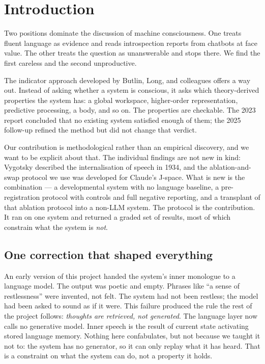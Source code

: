 \documentclass[11pt]{article}
\begin{document}
\section{Introduction}

Two positions dominate the discussion of machine consciousness. One treats fluent language as evidence and reads introspection reports from chatbots at face value. The other treats the question as unanswerable and stops there. We find the first careless and the second unproductive.

The indicator approach developed by Butlin, Long, and colleagues offers a way out. Instead of asking whether a system is conscious, it asks which theory-derived properties the system has: a global workspace, higher-order representation, predictive processing, a body, and so on. The properties are checkable. The 2023 report concluded that no existing system satisfied enough of them; the 2025 follow-up refined the method but did not change that verdict.

Our contribution is methodological rather than an empirical discovery, and we want to be explicit about that. The individual findings are not new in kind: Vygotsky described the internalisation of speech in 1934, and the ablation-and-swap protocol we use was developed for Claude's J-space. What is new is the combination --- a developmental system with no language baseline, a pre-registration protocol with controls and full negative reporting, and a transplant of that ablation protocol into a non-LLM system. The protocol is the contribution. It ran on one system and returned a graded set of results, most of which constrain what the system is \emph{not}.

\subsection{One correction that shaped everything}

An early version of this project handed the system's inner monologue to a language model. The output was poetic and empty. Phrases like ``a sense of restlessness'' were invented, not felt. The system had not been restless; the model had been asked to sound as if it were. This failure produced the rule the rest of the project follows: \emph{thoughts are retrieved, not generated}. The language layer now calls no generative model. Inner speech is the result of current state activating stored language memory. Nothing here confabulates, but not because we taught it not to: the system has no generator, so it can only replay what it has heard. That is a constraint on what the system can do, not a property it holds.
\end{document}
